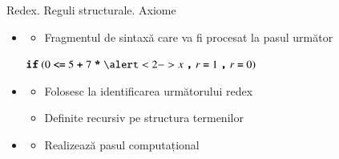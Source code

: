 \documentclass[xcolor=pdftex,romanian,colorlinks]{beamer}
\begin{document}
  \begin{frame}{Redex. Reguli structurale. Axiome}
  \bigskip
  \begin{itemize}
  	\item {}
	\begin{itemize}
		\item  Fragmentul de sintaxă care va fi procesat la pasul următor
	 \end{itemize}
	\begin{center}
	 $\Sif (0 \terminal{<=} 5 \terminal{+} 7 \terminal{*} \alert<2->{x}\terminal{,} r \terminal{=}1\terminal{,}  r \terminal{=}0)$
	 \end{center}
	 \medskip 

	 \item  <3->{ 
	 \begin{itemize}
		\item  Folosesc la identificarea următorului redex
		\item Definite recursiv pe structura termenilor
	 \end{itemize}}
  	
  	\item <5->{
	\begin{itemize}
		\item Realizează pasul computațional
	 \end{itemize}}
	 \vspace{-.2cm}
  \end{itemize}
\end{frame}




  
\end{document}

